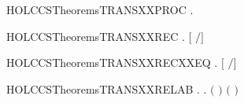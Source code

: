 \begin{SaveVerbatim}{HOLCCSTheoremsTRANSXXPROC}
\HOLTokenTurnstile{} \HOLSymConst{\HOLTokenForall{}}  .  \HOLTokenTransBegin{}\HOLTokenTransEnd {} \HOLSymConst{\HOLTokenConj{}}   \HOLSymConst{\HOLTokenImp{}}  
\end{SaveVerbatim}
\newcommand{\HOLCCSTheoremsTRANSXXPROC}{\UseVerbatim{HOLCCSTheoremsTRANSXXPROC}}
\begin{SaveVerbatim}{HOLCCSTheoremsTRANSXXREC}
\HOLTokenTurnstile{} \HOLSymConst{\HOLTokenForall{}}   .    \HOLTokenTransBegin{}\HOLTokenTransEnd {} \HOLSymConst{\HOLTokenImp{}} \ensuremath{[}  \ensuremath{/}\ensuremath{]}  \HOLTokenTransBegin{}\HOLTokenTransEnd {}
\end{SaveVerbatim}
\newcommand{\HOLCCSTheoremsTRANSXXREC}{\UseVerbatim{HOLCCSTheoremsTRANSXXREC}}
\begin{SaveVerbatim}{HOLCCSTheoremsTRANSXXRECXXEQ}
\HOLTokenTurnstile{} \HOLSymConst{\HOLTokenForall{}}   .    \HOLTokenTransBegin{}\HOLTokenTransEnd {} \HOLSymConst{\HOLTokenEquiv{}} \ensuremath{[}  \ensuremath{/}\ensuremath{]}  \HOLTokenTransBegin{}\HOLTokenTransEnd {}
\end{SaveVerbatim}
\newcommand{\HOLCCSTheoremsTRANSXXRECXXEQ}{\UseVerbatim{HOLCCSTheoremsTRANSXXRECXXEQ}}
\begin{SaveVerbatim}{HOLCCSTheoremsTRANSXXRELAB}
\HOLTokenTurnstile{} \HOLSymConst{\HOLTokenForall{}}   .
          \HOLTokenTransBegin{}\HOLTokenTransEnd {} \HOLSymConst{\HOLTokenImp{}}
       \HOLSymConst{\HOLTokenExists{}} .
           \ensuremath{(} \HOLSymConst{\ensuremath{=}}   \ensuremath{)} \HOLSymConst{\HOLTokenConj{}} \ensuremath{(} \HOLSymConst{\ensuremath{=}}   \ensuremath{)} \HOLSymConst{\HOLTokenConj{}}
            \HOLTokenTransBegin{}\HOLTokenTransEnd {}
\end{SaveVerbatim}
